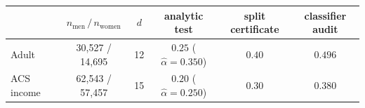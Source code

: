 \begin{tabular}{lccccc}
\toprule
& $n_{\mathrm{men}}\,/\,n_{\mathrm{women}}$ & $d$ & analytic test & split certificate & classifier audit \\
\midrule
Adult & 30{,}527 / 14{,}695 & 12 & $0.25$ ($\widehat\alpha=0.350$) & $0.40$ & $0.496$ \\
ACS income & 62{,}543 / 57{,}457 & 15 & $0.20$ ($\widehat\alpha=0.250$) & $0.30$ & $0.380$ \\
\bottomrule
\end{tabular}
